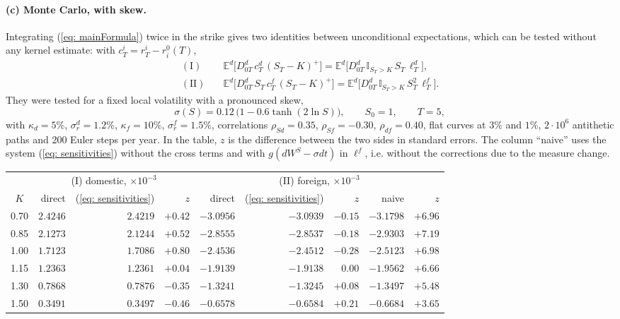 \paragraph{(c) Monte Carlo, with skew.} Integrating (\ref{eq: mainFormula}) twice in the strike gives two identities between unconditional expectations, which can be tested without any kernel estimate: with $c^i_T=r^i_T-r^0_i(T)$,
\begin{align*}
\mathrm{(I)}\quad&\mathbb{E}^d\big[D^d_{0T}\,c^d_T\,(S_T-K)^+\big]=\mathbb{E}^d\big[D^d_{0T}\,\mathbb{I}_{S_T>K}\,S_T\,\ell^d_T\big],\\
\mathrm{(II)}\quad&\mathbb{E}^d\big[D^d_{0T}\,S_T\,c^f_T\,(S_T-K)^+\big]=\mathbb{E}^d\big[D^d_{0T}\,\mathbb{I}_{S_T>K}\,S_T^2\,\ell^f_T\big].
\end{align*}
They were tested for a fixed local volatility with a pronounced skew,
$$\sigma(S)=0.12\,\big(1-0.6\tanh(2\ln S)\big),\qquad S_0=1,\qquad T=5,$$
with $\kappa_d=5\%$, $\sigma^d_r=1.2\%$, $\kappa_f=10\%$, $\sigma^f_r=1.5\%$, correlations
$\rho_{Sd}=0.35$, $\rho_{Sf}=-0.30$, $\rho_{df}=0.40$, flat curves at $3\%$ and
$1\%$, $2\cdot10^6$ antithetic paths and 200 Euler steps per year. In the table, $z$ is the difference between the two sides in standard errors. The column ``naive'' uses the system (\ref{eq: sensitivities}) without the cross terms and with $g(dW^S-\sigma dt)$ in $\ell^f$, i.e. without the corrections due to the measure change.

\begin{center}
\begin{tabular}{c|rrr|rrr|rr}
\toprule
 & \multicolumn{3}{c|}{(I) domestic, $\times10^{-3}$} & \multicolumn{5}{c}{(II) foreign, $\times10^{-3}$}\\
$K$ & direct & (\ref{eq: sensitivities}) & $z$ & direct & (\ref{eq: sensitivities}) & $z$ & naive & $z$\\
\midrule
0.70 & $2.4246$ & $2.4219$ & $+0.42$ & $-3.0956$ & $-3.0939$ & $-0.15$ & $-3.1798$ & $+6.96$\\
0.85 & $2.1273$ & $2.1244$ & $+0.52$ & $-2.8555$ & $-2.8537$ & $-0.18$ & $-2.9303$ & $+7.19$\\
1.00 & $1.7123$ & $1.7086$ & $+0.80$ & $-2.4536$ & $-2.4512$ & $-0.28$ & $-2.5123$ & $+6.98$\\
1.15 & $1.2363$ & $1.2361$ & $+0.04$ & $-1.9139$ & $-1.9138$ & $0.00$ & $-1.9562$ & $+6.66$\\
1.30 & $0.7868$ & $0.7876$ & $-0.35$ & $-1.3241$ & $-1.3245$ & $+0.08$ & $-1.3497$ & $+5.48$\\
1.50 & $0.3491$ & $0.3497$ & $-0.46$ & $-0.6578$ & $-0.6584$ & $+0.21$ & $-0.6684$ & $+3.65$\\
\bottomrule
\end{tabular}
\end{center}

